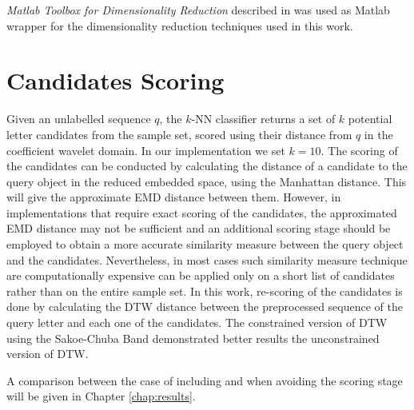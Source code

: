 \iftoggle{edit-mode}{\hspace{0pt}\marginpar{The DR package}}{}
\emph{Matlab Toolbox for Dimensionality Reduction} described in \cite{van2007introduction} was used as Matlab wrapper for the dimensionality reduction techniques used in this work.

\section{Candidates Scoring}
\label{sec:candidates_scoring}

Given an unlabelled sequence $q$, the $k$-NN classifier returns a set of $k$ potential letter candidates from the sample set, scored using their distance from $q$ in the coefficient wavelet domain.
In our implementation we set $k=10$.
The scoring of the candidates can be conducted by calculating the distance of a candidate to the query object in the reduced embedded space, using the Manhattan distance.
This will give the approximate EMD distance between them. 
However, in implementations that require exact scoring of the candidates, the approximated EMD distance may not be sufficient and an additional scoring stage should be employed to obtain a more accurate similarity measure between the query object and the candidates.
Nevertheless, in most cases such similarity measure technique are computationally expensive can be applied only on a short list of candidates rather than on the entire sample set.
In this work, re-scoring of the candidates is done by calculating the DTW distance between the preprocessed sequence of the query letter and each one of the candidates.
The constrained version of DTW using the Sakoe-Chuba Band \cite{sakoe1978dynamic} demonstrated better results the unconstrained version of DTW.

A comparison between the case of including and when avoiding the scoring stage will be given in Chapter \ref{chap:results}.


%
%
%
